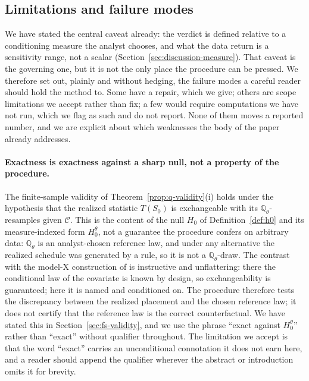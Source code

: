 \documentclass[preprint,12pt]{elsarticle}
\theoremstyle{definition}
\begin{document}
\subsection{Limitations and failure modes}
\label{sec:limitations}

We have stated the central caveat already: the verdict is defined relative to a
conditioning measure the analyst chooses, and what the data return is a sensitivity
range, not a scalar (Section~\ref{sec:discussion-measure}). That caveat is the
governing one, but it is not the only place the procedure can be pressed. We
therefore set out, plainly and without hedging, the failure modes a careful reader
should hold the method to. Some have a repair, which we give; others are scope
limitations we accept rather than fix; a few would require computations we have not
run, which we flag as such and do not report. None of them moves a reported number,
and we are explicit about which weaknesses the body of the paper already addresses.

\paragraph{Exactness is exactness against a sharp null, not a property of the
procedure.} The finite-sample validity of Theorem~\ref{prop:q-validity}(i)
holds under the hypothesis that the realized statistic $T(S_0)$ is exchangeable with
its $\mathbb{Q}_\theta$-resamples given $\mathcal{C}$. This is the content of the
null $H_0$ of Definition~\ref{def:h0} and its measure-indexed form $H_0^\theta$, not a guarantee the procedure confers
on arbitrary data: $\mathbb{Q}_\theta$ is an analyst-chosen reference law, and under
any alternative the realized schedule was generated by a rule, so it is not a
$\mathbb{Q}_\theta$-draw. The contrast with the model-X construction of
\cite{Candes2018} is instructive and unflattering: there the conditional law of the
covariate is known by design, so exchangeability is guaranteed; here it is named and
conditioned on. The procedure therefore tests the discrepancy between the realized
placement and the chosen reference law; it does not certify that the reference law is
the correct counterfactual. We have stated this in
Section~\ref{sec:fs-validity}, and we use the phrase ``exact against $H_0^\theta$''
rather than ``exact'' without qualifier throughout. The limitation we accept is that
the word ``exact'' carries an unconditional connotation it does not earn here, and a
reader should append the qualifier wherever the abstract or introduction omits it for
brevity.
\end{document}
